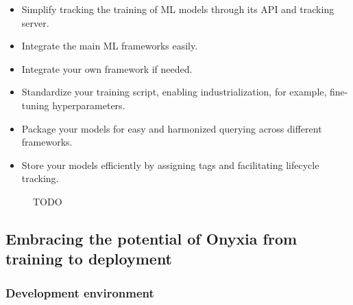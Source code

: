 \begin{itemize}
    \item Simplify tracking the training of ML models through its API and tracking server.
    \item Integrate the main ML frameworks easily.
    \item Integrate your own framework if needed.
    \item Standardize your training script, enabling industrialization, for example, fine-tuning hyperparameters.
    \item Package your models for easy and harmonized querying across different frameworks.
    \item Store your models efficiently by assigning tags and facilitating lifecycle tracking.
\end{itemize}

\begin{figure}[htbp]
    \centering
    \caption{TODO}
    \label{fig:mlflow-registry}
\end{figure}






\subsection{Embracing the potential of Onyxia from training to deployment}

\subsubsection{Development environment}


